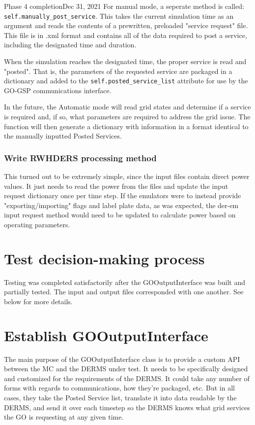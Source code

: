 \begin{entry}{Phase 4 completion}{Dec 31, 2021}
    For manual mode, a seperate method is called: \verb|self.manually_post_service|. This takes the current simulation
    time as an argument and reads the contents of a prewritten, preloaded "service request" file. This file is in .xml
    format and contains all of the data required to post a service, including the designated time and duration.

    When the simulation reaches the designated time, the proper service is read and "posted". That is, the parameters of
    the requested service are packaged in a dictionary and added to the \verb|self.posted_service_list| attribute for
    use by the GO-GSP communications interface.

    In the future, the Automatic mode will read grid states and determine if a service is required and, if so, what
    parameters are required to address the grid issue. The function will then generate a dictionary with information in
    a format identical to the manually inputted Posted Services.

    \subsubsection*{Write RWHDERS processing method}
    This turned out to be extremely simple, since the input files contain direct power values. It just needs to read the
    power from the files and update the input request dictionary once per time step. If the emulators were to instead
    provide "exporting/importing" flags and label plate data, as was expected, the der-em input request method would
    need to be updated to calculate power based on operating parameters.


    \section*{Test decision-making process}
    Testing was completed satisfactorily after the GOOutputInterface was built and partially tested. The input and output
    files corresponded with one another. See below for more details.

    \section*{Establish GOOutputInterface}
    The main purpose of the GOOutputInterface class is to provide a custom API between the MC and the DERMS under test.
    It needs to be specifically designed and customized for the requirements of the DERMS. It could take any number of
    forms with regards to communications, how they're packaged, etc. But in all cases, they take the Posted Service list,
    translate it into data readable by the DERMS, and send it over each timestep so the DERMS knows what grid services
    the GO is requesting at any given time.


\end{entry}
